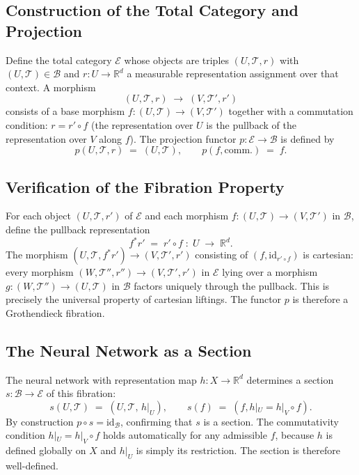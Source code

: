 \documentclass[12pt,a4paper]{article}
\theoremstyle{plain}
\theoremstyle{definition}
\newcommand{\E}{\mathcal{E}}
\newcommand{\B}{\mathcal{B}}
\begin{document}
\subsection*{Construction of the Total Category and Projection}

Define the total category $\E$ whose objects are triples $(U, \mathcal{T}, r)$
with $(U, \mathcal{T}) \in \B$ and $r : U \to \mathbb{R}^d$ a measurable
representation assignment over that context. A morphism
\[
(U, \mathcal{T}, r) \;\longrightarrow\; (V, \mathcal{T}', r')
\]
consists of a base morphism $f : (U, \mathcal{T}) \to (V, \mathcal{T}')$
together with a commutation condition: $r = r' \circ f$ (the representation
over $U$ is the pullback of the representation over $V$ along $f$). The
projection functor $p : \E \to \B$ is defined by
\[
p(U, \mathcal{T}, r) \;=\; (U, \mathcal{T}), \qquad
p(f, \mathrm{comm.}) \;=\; f.
\]

\subsection*{Verification of the Fibration Property}

For each object $(U, \mathcal{T}, r')$ of $\E$ and each morphism $f :
(U, \mathcal{T}) \to (V, \mathcal{T}')$ in $\B$, define the pullback
representation
\[
f^* r' \;=\; r' \circ f \;:\; U \;\longrightarrow\; \mathbb{R}^d.
\]
The morphism $(U, \mathcal{T}, f^* r') \to (V, \mathcal{T}', r')$ consisting
of $(f, \mathrm{id}_{r' \circ f})$ is cartesian: every morphism $(W, \mathcal{T}'',
r'') \to (V, \mathcal{T}', r')$ in $\E$ lying over a morphism $g : (W,
\mathcal{T}'') \to (U, \mathcal{T})$ in $\B$ factors uniquely through the
pullback. This is precisely the universal property of cartesian liftings.
The functor $p$ is therefore a Grothendieck fibration.

\subsection*{The Neural Network as a Section}

The neural network with representation map $h : X \to \mathbb{R}^d$ determines
a section $s : \B \to \E$ of this fibration:
\[
s(U, \mathcal{T}) \;=\; (U, \mathcal{T},\, h|_U), \qquad
s(f) \;=\; (f, h|_U = h|_V \circ f).
\]
By construction $p \circ s = \mathrm{id}_\B$, confirming that $s$ is a section.
The commutativity condition $h|_U = h|_V \circ f$ holds automatically for any
admissible $f$, because $h$ is defined globally on $X$ and $h|_U$ is simply
its restriction. The section is therefore well-defined.
\end{document}
